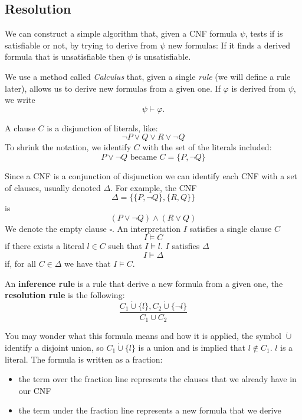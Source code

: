 \documentclass[10pt, letterpaper]{report}
\begin{document}
\subsection{Resolution}
We can construct a simple algorithm that, given a CNF formula $\psi$, tests if is satisfiable or not, by trying to derive from $\psi$ new formulas: If it finds a derived  formula that is unsatisfiable then $\psi$ is unsatisfiable.\bigskip 

We use a method called \textit{Calculus} that, given a single \textit{rule} (we will define a rule later), allows us to derive new formulas from a given one. If $\varphi$ is derived from $\psi$, we write $$\psi\vdash \varphi .$$
\begin{definition}
    A clause $C$ is a disjunction of literals, like:\begin{equation}
        \lnot P \lor Q \lor R \lor \lnot Q
    \end{equation}
    To shrink the notation, we identify $C$ with the set of the literals included:\begin{equation}
        P\lor \lnot Q \text{ became }C=\{P,\lnot Q\}
    \end{equation}
\end{definition}
Since a CNF is a conjunction of disjunction we can identify each CNF with a set of clauses, usually denoted $\Delta$. For example, the CNF\begin{equation}
    \Delta = \{\{P,\lnot Q\},\{R, Q\}\}
\end{equation}
is \begin{equation}
    (P\lor \lnot Q)\land (R\lor Q)
\end{equation}
We denote the empty clause $\square$. An interpretation $I$ satisfies a single clause $C$ $$I\models C$$ if there exists a literal $l\in C$ such that $I\models l$. $I$ satisfies $\Delta$ 
$$ I\models \Delta$$ 
if, for all $C\in \Delta$ we have that $I\models C$.
\begin{definition}
    An \textbf{inference rule} is a rule that derive a new formula from a given one, the \textbf{resolution rule} is the following:\begin{equation}
        \frac{C_1\dot\cup \{l\},C_2\dot\cup\{\lnot l\}}{C_1\cup C_2}
    \end{equation}
\end{definition}
You may wonder what this formula means and how it is applied, the symbol $\dot\cup$ identify a disjoint union, so $C_1\dot\cup \{l\}$ is a union and is implied that $l\notin C_1$. $l$ is a literal. The formula is written as a fraction:\begin{itemize}
    \item the term over the fraction line represents the clauses that we already have in our CNF 
    \item the term under the fraction line represents a new formula that we derive 
\end{itemize}
\end{document}
